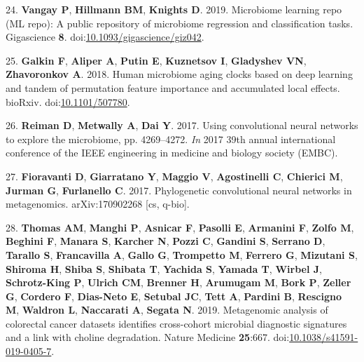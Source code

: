 \documentclass[
  11pt,
]{article}
\begin{document}
\leavevmode\hypertarget{ref-vangay_microbiome_2019}{}%
24. \textbf{Vangay P}, \textbf{Hillmann BM}, \textbf{Knights D}. 2019.
Microbiome learning repo (ML repo): A public repository of microbiome
regression and classification tasks. Gigascience \textbf{8}.
doi:\href{https://doi.org/10.1093/gigascience/giz042}{10.1093/gigascience/giz042}.

\leavevmode\hypertarget{ref-galkin_human_2018}{}%
25. \textbf{Galkin F}, \textbf{Aliper A}, \textbf{Putin E},
\textbf{Kuznetsov I}, \textbf{Gladyshev VN}, \textbf{Zhavoronkov A}.
2018. Human microbiome aging clocks based on deep learning and tandem of
permutation feature importance and accumulated local effects. bioRxiv.
doi:\href{https://doi.org/10.1101/507780}{10.1101/507780}.

\leavevmode\hypertarget{ref-reiman_using_2017}{}%
26. \textbf{Reiman D}, \textbf{Metwally A}, \textbf{Dai Y}. 2017. Using
convolutional neural networks to explore the microbiome, pp. 4269--4272.
\emph{In} 2017 39th annual international conference of the IEEE
engineering in medicine and biology society (EMBC).

\leavevmode\hypertarget{ref-fioravanti_phylogenetic_2017}{}%
27. \textbf{Fioravanti D}, \textbf{Giarratano Y}, \textbf{Maggio V},
\textbf{Agostinelli C}, \textbf{Chierici M}, \textbf{Jurman G},
\textbf{Furlanello C}. 2017. Phylogenetic convolutional neural networks
in metagenomics. arXiv:170902268 {[}cs, q-bio{]}.

\leavevmode\hypertarget{ref-thomas_metagenomic_2019}{}%
28. \textbf{Thomas AM}, \textbf{Manghi P}, \textbf{Asnicar F},
\textbf{Pasolli E}, \textbf{Armanini F}, \textbf{Zolfo M},
\textbf{Beghini F}, \textbf{Manara S}, \textbf{Karcher N}, \textbf{Pozzi
C}, \textbf{Gandini S}, \textbf{Serrano D}, \textbf{Tarallo S},
\textbf{Francavilla A}, \textbf{Gallo G}, \textbf{Trompetto M},
\textbf{Ferrero G}, \textbf{Mizutani S}, \textbf{Shiroma H},
\textbf{Shiba S}, \textbf{Shibata T}, \textbf{Yachida S}, \textbf{Yamada
T}, \textbf{Wirbel J}, \textbf{Schrotz-King P}, \textbf{Ulrich CM},
\textbf{Brenner H}, \textbf{Arumugam M}, \textbf{Bork P}, \textbf{Zeller
G}, \textbf{Cordero F}, \textbf{Dias-Neto E}, \textbf{Setubal JC},
\textbf{Tett A}, \textbf{Pardini B}, \textbf{Rescigno M},
\textbf{Waldron L}, \textbf{Naccarati A}, \textbf{Segata N}. 2019.
Metagenomic analysis of colorectal cancer datasets identifies
cross-cohort microbial diagnostic signatures and a link with choline
degradation. Nature Medicine \textbf{25}:667.
doi:\href{https://doi.org/10.1038/s41591-019-0405-7}{10.1038/s41591-019-0405-7}.
\end{document}
